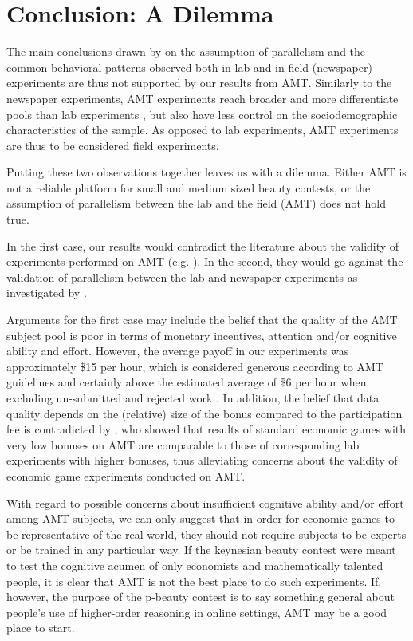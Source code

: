 \documentclass[12pt,review]{elsarticle}
\begin{document}
\section{Conclusion: A Dilemma\label{sec:Conclusion}}
\noindent
The main conclusions drawn by \cite{NagelEtAl02} on the assumption of parallelism and the common behavioral patterns observed both in lab and in field (newspaper) experiments are thus not supported by our results from AMT. Similarly to the newspaper experiments, AMT experiments reach broader and more differentiate pools than lab experiments \citep{BuhrmesterEtAl2011,CrumpEtAl13,HortonEtAl2011,Rand2012}, but also have less control on the sociodemographic characteristics of the sample. As opposed to lab experiments, AMT experiments are
thus to be considered field experiments. 

Putting these two observations together leaves us with a dilemma. Either AMT is not a reliable platform for small and medium sized beauty contests, or the assumption of parallelism between the lab and the field (AMT) does not hold true. 

In the first case, our results would contradict the literature about the validity of experiments performed on AMT (e.g. \cite{BuhrmesterEtAl2011,CrumpEtAl13,HortonEtAl2011,Rand2012}). In the second, they would go against the validation of parallelism between the lab and newspaper experiments as investigated by \cite{NagelEtAl02}. 

Arguments for the first case may include the belief that the quality of the AMT subject pool is poor in terms of monetary incentives, attention and/or cognitive ability and effort. However, the average payoff in our experiments was approximately \$15 per hour, which is considered generous according to AMT guidelines and certainly above the estimated average of \$6 per hour when excluding un-submitted and rejected work \citep{HaraEtAl18}. In addition, the belief that data quality depends on the (relative) size of the bonus compared to the participation fee is contradicted by \cite{amir2012economic}, who showed that results of standard economic games with very low bonuses on AMT are comparable to those of corresponding lab experiments with higher bonuses, thus alleviating concerns about the validity of economic game experiments conducted on AMT. 

With regard to possible concerns about insufficient cognitive ability and/or effort among AMT subjects, we can only suggest that in order for economic games to be representative of the real world, they should not require subjects to be experts or be trained in any particular way. If the keynesian beauty contest were meant to test the cognitive acumen of only economists and mathematically talented people, it is clear that AMT is not the best place to do such experiments. If, however, the purpose of the p-beauty contest is to say something general about people's use of higher-order reasoning in online settings, AMT may be a good place to start. 
\end{document}

